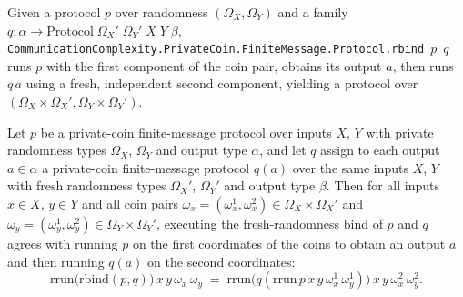 \begin{definition}
\label{CommunicationComplexity.PrivateCoin.FiniteMessage.Protocol.rbind}
\leanok
{}
Given a protocol $p$ over randomness $(\Omega_X, \Omega_Y)$ and a family
$q : \alpha \to \mathrm{Protocol}\;\Omega_X'\;\Omega_Y'\;X\;Y\;\beta$,
\texttt{CommunicationComplexity.PrivateCoin.FiniteMessage.Protocol.rbind}~$p$~$q$ runs $p$ with the first component of the coin pair,
obtains its output $a$, then runs $q\,a$ using a fresh, independent second component,
yielding a protocol over $(\Omega_X \times \Omega_X', \Omega_Y \times \Omega_Y')$.
\end{definition}

\begin{theorem}
\label{CommunicationComplexity.PrivateCoin.FiniteMessage.Protocol.rbind_rrun}
\leanok
{}
Let $p$ be a private-coin finite-message protocol over inputs $X$, $Y$ with private
randomness types $\Omega_X$, $\Omega_Y$ and output type $\alpha$, and let $q$ assign to
each output $a\in\alpha$ a private-coin finite-message protocol $q(a)$ over the same
inputs $X$, $Y$ with fresh randomness types $\Omega_X'$, $\Omega_Y'$ and output type
$\beta$. Then for all inputs $x\in X$, $y\in Y$ and all coin pairs
$\omega_x=(\omega_x^1,\omega_x^2)\in\Omega_X\times\Omega_X'$ and
$\omega_y=(\omega_y^1,\omega_y^2)\in\Omega_Y\times\Omega_Y'$, executing the
fresh-randomness bind of $p$ and $q$ agrees with running $p$ on the first coordinates of
the coins to obtain an output $a$ and then running $q(a)$ on the second coordinates:
\[
  \mathrm{rrun}\big(\mathrm{rbind}(p,q)\big)\,x\,y\,\omega_x\,\omega_y
  \;=\;
\mathrm{rrun}\big(q(\mathrm{rrun}\,p\,x\,y\,\omega_x^1\,\omega_y^1)\big)\,x\,y\,\omega_x^2\,\omega_y^2
.
\]
\end{theorem}

